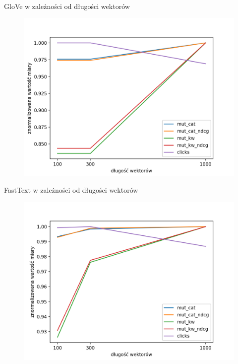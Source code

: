 \documentclass{beamer}
\begin{document}
	\begin{frame}{GloVe w zależności od długości wektorów}
		\begin{figure}[H]
			\centering
			\includegraphics[width=1\textwidth]{img/results/gv_ctr.png}
		\end{figure}
	\end{frame}
	\begin{frame}{FastText w zależności od długości wektorów}
		\begin{figure}[H]
			\centering
			\includegraphics[width=1\textwidth]{img/results/ft_ctr.png}
		\end{figure}
	\end{frame}
\end{document}
